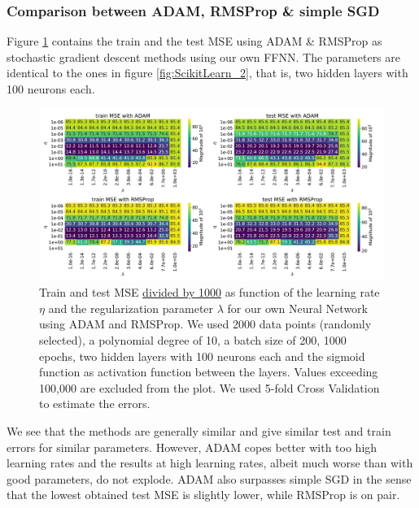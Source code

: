 \documentclass[11pt,a4paper,titlepage]{article}
\begin{document}
\subsubsection{Comparison between ADAM, RMSProp \& simple SGD}
Figure \ref{fig:ADAMvsRMSProp} contains the train and the test MSE using ADAM \& RMSProp as stochastic gradient descent methods using our own FFNN. The parameters are identical to the ones in figure \ref{fig:ScikitLearn_2}, that is, two hidden layers with 100 neurons each. 
\begin{figure}[H]
\centering
\includegraphics[width=1.05\textwidth]{ADAM_RMSProp_2b1_logisticRMSProp200010.pdf}
\caption[ADAM \& RMSProp with 2 layers]{Train and test MSE \underline{divided by 1000} as function of the learning rate $\eta$ and the regularization parameter $\lambda$ for our own Neural Network using ADAM and RMSProp. We used 2000 data points (randomly selected), a polynomial degree of 10, a batch size of 200, 1000 epochs, two hidden layers with 100 neurons each and the sigmoid function as activation function between the layers. Values exceeding 100,000 are excluded from the plot. We used 5-fold Cross Validation to estimate the errors.} \label{fig:ADAMvsRMSProp}
\end{figure}
We see that the methods are generally similar and give similar test and train errors for similar parameters. However, ADAM copes better with too high learning rates and the results at high learning rates, albeit much worse than with good parameters, do not explode. ADAM also surpasses simple SGD in the sense that the lowest obtained test MSE is slightly lower, while RMSProp is on pair. 
\end{document}
